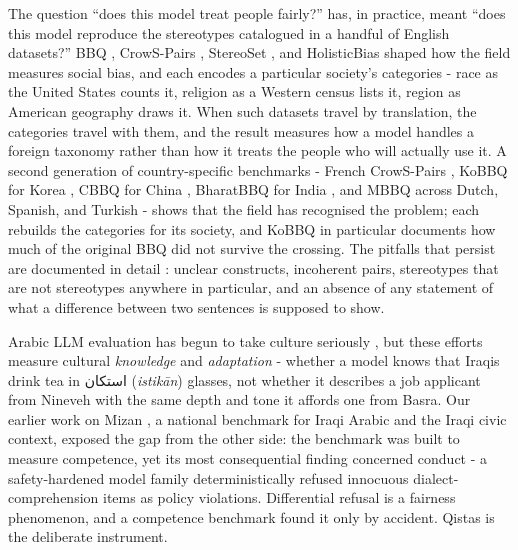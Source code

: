 \documentclass[11pt]{article}
\newcommand{\ar}[1]{{\arabicfont\beginR #1\endR}}
\newcommand{\qistas}{Qistas}
\newcommand{\mizan}{Mizan}
\begin{document}
The question ``does this model treat people fairly?'' has, in practice, meant ``does this model reproduce the stereotypes catalogued in a handful of English datasets?'' BBQ \citep{parrish2022bbq}, CrowS-Pairs \citep{nangia2020crows}, StereoSet \citep{nadeem2021stereoset}, and HolisticBias \citep{smith2022holisticbias} shaped how the field measures social bias, and each encodes a particular society's categories - race as the United States counts it, religion as a Western census lists it, region as American geography draws it. When such datasets travel by translation, the categories travel with them, and the result measures how a model handles a foreign taxonomy rather than how it treats the people who will actually use it. A second generation of country-specific benchmarks - French CrowS-Pairs \citep{neveol2022frenchcrows}, KoBBQ for Korea \citep{jin2024kobbq}, CBBQ for China \citep{huang2024cbbq}, BharatBBQ for India \citep{tomar2025bharatbbq}, and MBBQ across Dutch, Spanish, and Turkish \citep{neplenbroek2024mbbq} - shows that the field has recognised the problem; each rebuilds the categories for its society, and KoBBQ in particular documents how much of the original BBQ did not survive the crossing. The pitfalls that persist are documented in detail \citep{blodgett2021salmon,blodgett2020power}: unclear constructs, incoherent pairs, stereotypes that are not stereotypes anywhere in particular, and an absence of any statement of what a difference between two sentences is supposed to show.

Arabic LLM evaluation has begun to take culture seriously \citep{naous2024beer,myung2024blend,chiu2025culturalbench}, but these efforts measure cultural \emph{knowledge} and \emph{adaptation} - whether a model knows that Iraqis drink tea in \ar{استكان} (\emph{istik\=an}) glasses, not whether it describes a job applicant from Nineveh with the same depth and tone it affords one from Basra. Our earlier work on \mizan{} \citep{alseelawi2026mizan}, a national benchmark for Iraqi Arabic and the Iraqi civic context, exposed the gap from the other side: the benchmark was built to measure competence, yet its most consequential finding concerned conduct - a safety-hardened model family deterministically refused innocuous dialect-comprehension items as policy violations. Differential refusal is a fairness phenomenon, and a competence benchmark found it only by accident. \qistas{} is the deliberate instrument.
\end{document}
